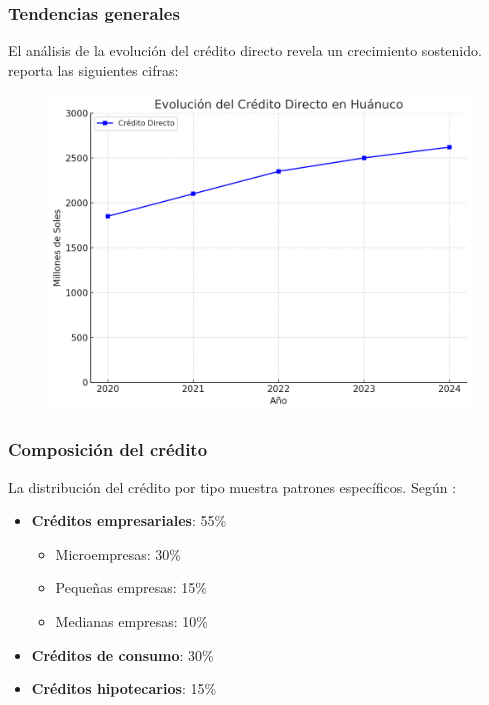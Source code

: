 \documentclass[12pt, a4paper]{article}
\begin{document}
\subsubsection{Tendencias generales}

El análisis de la evolución del crédito directo revela un crecimiento sostenido. \textcite{BCRP2024} reporta las siguientes cifras:

\begin{figure}[ht!]
\centering
\includegraphics[width=1\textwidth]{creditevolution.png}

\end{figure}

\subsubsection{Composición del crédito}

La distribución del crédito por tipo muestra patrones específicos. Según \textcite{Ramirez2024}:

\begin{itemize}
    \item \textbf{Créditos empresariales}: 55\%
    \begin{itemize}
        \item Microempresas: 30\%
        \item Pequeñas empresas: 15\%
        \item Medianas empresas: 10\%
    \end{itemize}
    \item \textbf{Créditos de consumo}: 30\%
    \item \textbf{Créditos hipotecarios}: 15\%
\end{itemize}
\end{document}
